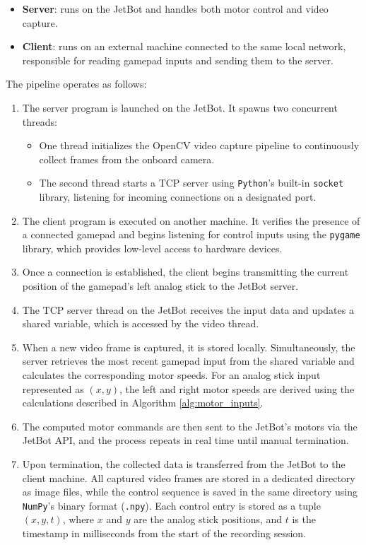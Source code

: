 \begin{itemize}
  \item \textbf{Server}: runs on the JetBot and handles both motor control and video capture.
  \item \textbf{Client}: runs on an external machine connected to the same local network, responsible for reading gamepad inputs and sending them to the server.
\end{itemize}

The pipeline operates as follows:

\begin{enumerate}
  \item The server program is launched on the JetBot. It spawns two concurrent threads:
    \begin{itemize}
      \item One thread initializes the OpenCV video capture pipeline to continuously collect frames from the onboard camera.
      \item The second thread starts a TCP server using \texttt{Python}’s built-in \texttt{socket} library, listening for incoming connections on a designated port.
    \end{itemize}

  \item The client program is executed on another machine. It verifies the presence of a connected gamepad and begins listening for control inputs using the \texttt{pygame} library, which provides low-level access to hardware devices.

  \item Once a connection is established, the client begins transmitting the current position of the gamepad’s left analog stick to the JetBot server.

  \item The TCP server thread on the JetBot receives the input data and updates a shared variable, which is accessed by the video thread.

  \item When a new video frame is captured, it is stored locally. Simultaneously, the server retrieves the most recent gamepad input from the shared variable and calculates the corresponding motor speeds. For an analog stick input represented as \( (x, y) \), the left and right motor speeds are derived using the calculations described in Algorithm \ref{alg:motor_inputs}.

  \item The computed motor commands are then sent to the JetBot’s motors via the JetBot API, and the process repeats in real time until manual termination.

  \item Upon termination, the collected data is transferred from the JetBot to the client machine. All captured video frames are stored in a dedicated directory as image files, while the control sequence is saved in the same directory using \texttt{NumPy}'s binary format (\texttt{.npy}). Each control entry is stored as a tuple \( (x, y, t) \), where \( x \) and \( y \) are the analog stick positions, and \( t \) is the timestamp in milliseconds from the start of the recording session.
\end{enumerate}


